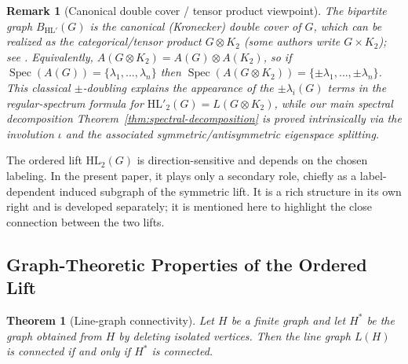 \documentclass[11pt]{article}
\newtheorem{theorem}{Theorem}
\newtheorem{remark}{Remark}
\newcommand{\HL}{\mathrm{HL}}
\theoremstyle{plain}
\begin{document}
\begin{remark}[Canonical double cover / tensor product viewpoint]\label{rem:canonical-double-cover}
The bipartite graph $B_{\mathrm{HL}'}(G)$ is the \emph{canonical (Kronecker) double cover} of $G$,
which can be realized as the categorical/tensor product $G\otimes K_2$
(some authors write $G\times K_2$); see \cite{imrichKlavzar2000}.
Equivalently, $A(G\otimes K_2)=A(G)\otimes A(K_2)$, so if
$\operatorname{Spec}(A(G))=\{\lambda_1,\dots,\lambda_n\}$ then
$\operatorname{Spec}(A(G\otimes K_2))=\{\pm\lambda_1,\dots,\pm\lambda_n\}$.
This classical $\pm$-doubling explains the appearance of the $\pm\lambda_i(G)$ terms in the
regular-spectrum formula for $\mathrm{HL}'_2(G)=L(G\otimes K_2)$, while our main spectral
decomposition Theorem~\ref{thm:spectral-decomposition} is proved intrinsically via the involution
$\iota$ and the associated symmetric/antisymmetric eigenspace splitting.
\end{remark}

The ordered lift \(\HL_2(G)\) is direction-sensitive and depends on the chosen labeling. In the present paper,
it plays only a secondary role, chiefly as a label-dependent induced subgraph of the symmetric lift. It is a
rich structure in its own right and is developed separately; it is mentioned here to highlight the close
connection between the two lifts.

\subsection{Graph-Theoretic Properties of the Ordered Lift}

\begin{theorem}[Line-graph connectivity]\label{thm:linegraph-connectivity}
Let $H$ be a finite graph and let $H^\ast$ be the graph obtained from $H$ by deleting isolated vertices.
Then the line graph $L(H)$ is connected if and only if $H^\ast$ is connected.
\end{theorem}
\end{document}
